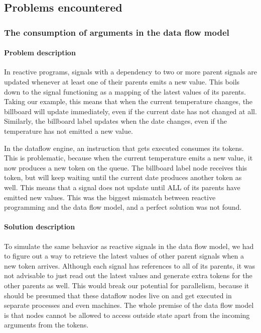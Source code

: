 \subsection{Problems encountered}

\subsubsection{The consumption of arguments in the data flow model}

\paragraph{Problem description}

In reactive programs, signals with a dependency to two or more parent signals are updated whenever at least one of their parents emits a new value. This boils down to the signal functioning as a mapping of the latest values of its parents. Taking our example, this means that when the current temperature changes, the billboard will update immediately, even if the current date has not changed at all.
Similarly, the billboard label updates when the date changes, even if the temperature has not emitted a new value.

In the dataflow engine, an instruction that gets executed consumes its tokens. This is problematic, because when the current temperature emits a new value, it now produces a new token on the queue. 
The billboard label node receives this token, but will keep waiting until the current date produces another token as well. This means that a signal does not update until ALL of its parents have emitted new values.
This was the biggest mismatch between reactive programming and the data flow model, and a perfect solution was not found.

\paragraph{Solution description}

To simulate the same behavior as reactive signals in the data flow model, we had to figure out a way to retrieve the latest values of other parent signals when a new token arrives. 
Although each signal has references to all of its parents, it was not advisable to just read out the latest values and generate extra tokens for the other parents as well. 
This would break our potential for parallelism, because it should be presumed that these dataflow nodes live on and get executed in separate processes and even machines.
The whole premise of the data flow model is that nodes cannot be allowed to access outside state apart from the incoming arguments from the tokens.

